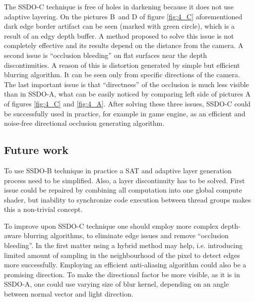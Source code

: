 \documentclass[10pt,journal,compsoc,twoside]{IEEEtran}
\begin{document}
The SSDO-C technique is free of holes in darkening because it does not use adaptive layering. On the pictures B~and D of figure \ref{fig:4_C} aforementioned dark edge border artifact can be seen (marked with green circle), which is a result of an edgy depth buffer. A method proposed to solve this issue is not completely effective and its results depend on the distance from the camera. A second issue is ``occlusion bleeding'' on flat surfaces near the depth discontinuities. A reason of this is distortion generated by simple but efficient blurring algorithm. It can be seen only from specific directions of the camera. The last important issue is that ``directness'' of the occlusion is much less visible than in SSDO-A, what can be easily noticed by comparing left side of pictures A of figures \ref{fig:4_C} and \ref{fig:4_A}. After solving these three issues, SSDO-C could be successfully used in practice, for example in game engine, as an efficient and noise-free directional occlusion generating algorithm.

	\subsection{Future work}\label{t:conclusion:futurework}
	
	To use SSDO-B technique in practice a SAT and adaptive layer generation process need to be simplified. Also, a layer discontinuity has to be solved. First issue could be repaired by combining all computation into one global compute shader, but inability to synchronize code execution between thread groups makes this a non-trivial concept.
	
	To improve upon SSDO-C technique one should employ more complex depth-aware blurring algorithms, to eliminate edge issues and remove ``occlusion bleeding''. In the first matter using a hybrid method may help, i.e. introducing limited amount of sampling in the neighbourhood of the pixel to detect edges more successfully. Employing an efficient anti-aliasing algorithm could also be a promising direction. To make the directional factor be more visible, as it is in SSDO-A, one could use varying size of blur kernel, depending on an angle between normal vector and light direction.

\end{document}
